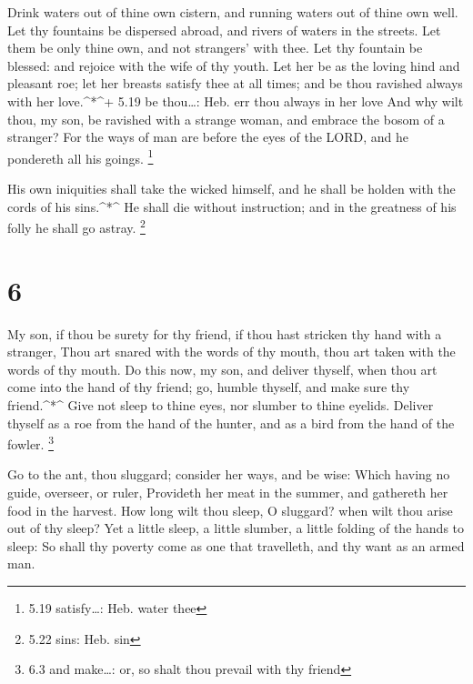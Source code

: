  Drink waters out of thine own cistern, and running waters
out of thine own well.  Let thy fountains be dispersed
abroad, and rivers of waters in the streets.  Let them be
only thine own, and not strangers' with thee.  Let thy
fountain be blessed: and rejoice with the wife of thy youth.
 Let her be as the loving hind and pleasant roe; let her
breasts satisfy thee at all times; and be thou ravished always with her
love.\^{}*\^{}+ 5.19 be thou\ldots: Heb. err thou always in her love
 And why wilt thou, my son, be ravished with a strange
woman, and embrace the bosom of a stranger?  For the ways
of man are before the eyes of the LORD, and he pondereth all his goings.
\footnote{5.19 satisfy\ldots: Heb. water thee}

 His own iniquities shall take the wicked himself, and he
shall be holden with the cords of his sins.\^{}*\^{}  He
shall die without instruction; and in the greatness of his folly he
shall go astray. \footnote{5.22 sins: Heb. sin}

\hypertarget{section-5}{%
\section{6}\label{section-5}}

 My son, if thou be surety for thy friend, if thou hast
stricken thy hand with a stranger,  Thou art snared with the
words of thy mouth, thou art taken with the words of thy mouth.
 Do this now, my son, and deliver thyself, when thou art
come into the hand of thy friend; go, humble thyself, and make sure thy
friend.\^{}*\^{}  Give not sleep to thine eyes, nor slumber
to thine eyelids.  Deliver thyself as a roe from the hand of
the hunter, and as a bird from the hand of the fowler. \footnote{6.3 and
  make\ldots: or, so shalt thou prevail with thy friend}

 Go to the ant, thou sluggard; consider her ways, and be
wise:  Which having no guide, overseer, or ruler,
 Provideth her meat in the summer, and gathereth her food in
the harvest.  How long wilt thou sleep, O sluggard? when
wilt thou arise out of thy sleep?  Yet a little sleep, a
little slumber, a little folding of the hands to sleep:  So
shall thy poverty come as one that travelleth, and thy want as an armed
man.

